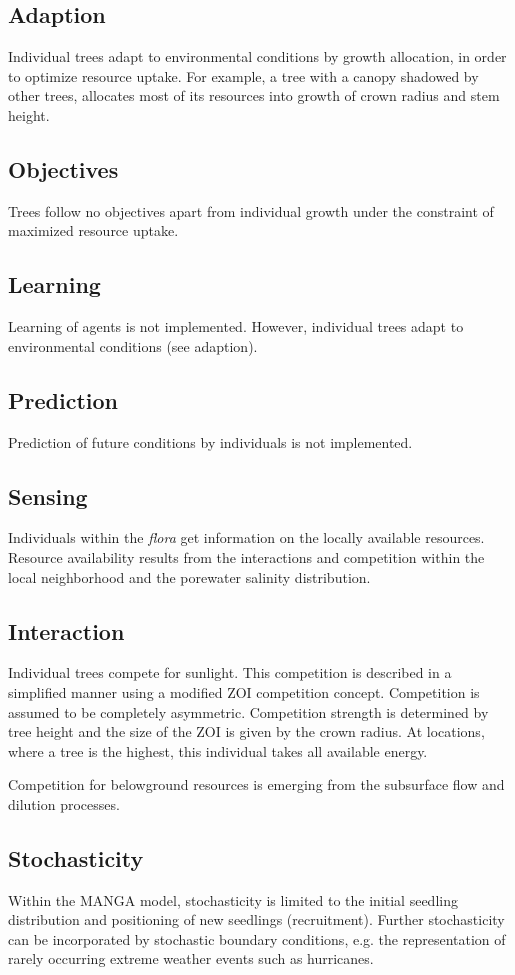 \documentclass[manusscript, 12p, authoryear]{elsarticle}
\begin{document}
\subsection{Adaption}
Individual trees adapt to environmental conditions by growth allocation, in order to optimize resource uptake.
For example, a tree with a canopy shadowed by other trees, allocates most of its resources into growth of crown radius and stem height.
\subsection{Objectives}
Trees follow no objectives apart from individual growth under the constraint of maximized resource uptake.
\subsection{Learning}
Learning of agents is not implemented.
However, individual trees adapt to environmental conditions (see adaption).
\subsection{Prediction}
Prediction of future conditions by individuals is not implemented.
\subsection{Sensing}
Individuals within the \textit{flora} get information on the locally available resources.
Resource availability results from the interactions and competition within the local neighborhood and the porewater salinity distribution.
\subsection{Interaction}
Individual trees compete for sunlight.
This competition is described in a simplified manner using a modified ZOI competition concept. 
Competition is assumed to be completely asymmetric.
Competition strength is determined by tree height and the size of the ZOI is given by the crown radius.
At locations, where a tree is the highest, this individual takes all available energy.

Competition for belowground resources is emerging from the subsurface flow and dilution processes.
\subsection{Stochasticity}
Within the MANGA model, stochasticity is limited to the initial seedling distribution and positioning of new seedlings (recruitment).
Further stochasticity can be incorporated by stochastic boundary conditions, e.g. the representation of rarely occurring extreme weather events such as hurricanes.
\end{document}
